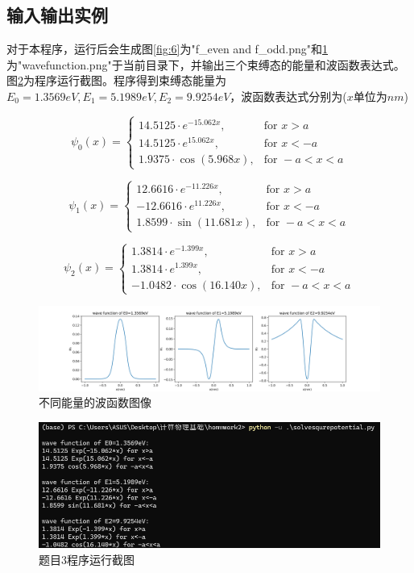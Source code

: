 \documentclass[11pt]{article}
\begin{document}
  \subsection{输入输出实例}
  对于本程序，运行后会生成图\ref{fig:6}为"f\_even and f\_odd.png"和\ref{fig:7}为"wavefunction.png"于当前目录下，并输出三个束缚态的能量和波函数表达式。图\ref{fig:8}为程序运行截图。程序得到束缚态能量为$E_0=1.3569 eV,E_1=5.1989 eV,E_2=9.9254 eV$，波函数表达式分别为($x$单位为$nm$)
   

$$
  \psi_0(x) = 
  \begin{cases} 
  14.5125 \cdot e^{-15.062x}, & \text{for } x > a \\
  14.5125 \cdot e^{15.062x}, & \text{for } x < -a \\
  1.9375 \cdot \cos(5.968x), & \text{for } -a < x < a 
  \end{cases}
  $$
  

  $$
  \psi_1(x) = 
  \begin{cases} 
  12.6616 \cdot e^{-11.226x}, & \text{for } x > a \\
  -12.6616 \cdot e^{11.226x}, & \text{for } x < -a \\
  1.8599 \cdot \sin(11.681x), & \text{for } -a < x < a 
  \end{cases}
  $$
  

  $$
  \psi_2(x) = 
  \begin{cases} 
  1.3814 \cdot e^{-1.399x}, & \text{for } x > a \\
  1.3814 \cdot e^{1.399x}, & \text{for } x < -a \\
  -1.0482 \cdot \cos(16.140x), & \text{for } -a < x < a 
  \end{cases}
  $$
  
  \begin{figure}[ht]
    \centering
    \includegraphics[width=1\linewidth]{photo/wavefunction.png}
    \caption{不同能量的波函数图像}
    \label{fig:7}
  \end{figure}
  \begin{figure}[ht]
    \centering
    \includegraphics[width=0.8\linewidth]{photo/fig8.png}
    \caption{题目3程序运行截图}
    \label{fig:8}
  \end{figure}
\end{document}
